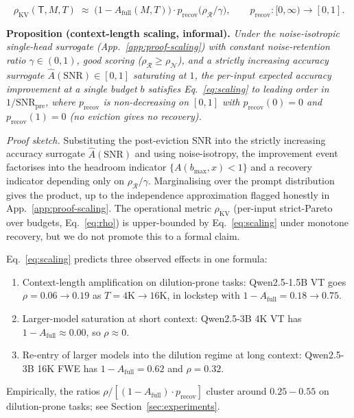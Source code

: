 \documentclass{article} %
\begin{document}
\begin{equation}
\label{eq:scaling}
\rho_{\mathrm{KV}}(\mathsf{T}, M, T) \;\approx\;
\bigl(1 - A_{\mathrm{full}}(M, T)\bigr) \cdot p_{\mathrm{recov}}\bigl(\rho_{\mathcal{R}} / \gamma\bigr),
\qquad p_{\mathrm{recov}}: [0, \infty) \to [0, 1].
\end{equation}

\textbf{Proposition (context-length scaling, informal).} \emph{Under the
noise-isotropic single-head surrogate (App.~\ref{app:proof-scaling}) with
constant noise-retention ratio $\gamma \in (0, 1)$, good scoring
($\rho_{\mathcal{R}} \ge \rho_{\mathcal{N}}$), and a strictly increasing
accuracy surrogate $\hat A(\mathrm{SNR}) \in [0, 1]$ saturating at $1$, the
per-input expected accuracy improvement at a single budget $b$ satisfies
Eq.~\eqref{eq:scaling} to leading order in $1/\mathrm{SNR}_{\mathrm{pre}}$,
where $p_{\mathrm{recov}}$ is non-decreasing on $[0, 1]$ with
$p_{\mathrm{recov}}(0) = 0$ and $p_{\mathrm{recov}}(1) = 0$ (no eviction
gives no recovery).}

\emph{Proof sketch.} Substituting the post-eviction SNR into the strictly
increasing accuracy surrogate $\hat A(\mathrm{SNR})$ and using
noise-isotropy, the improvement event factorises into the headroom
indicator $\{A(b_{\max}, x) < 1\}$ and a recovery indicator depending only
on $\rho_{\mathcal{R}} / \gamma$. Marginalising over the prompt
distribution gives the product, up to the independence approximation
flagged honestly in App.~\ref{app:proof-scaling}. The operational metric
$\rho_{\mathrm{KV}}$ (per-input strict-Pareto over budgets,
Eq.~\eqref{eq:rho}) is upper-bounded by Eq.~\eqref{eq:scaling} under
monotone recovery, but we do not promote this to a formal claim.

Eq.~\eqref{eq:scaling} predicts three observed effects in one formula:
\begin{enumerate}
\item Context-length amplification on dilution-prone tasks: Qwen2.5-1.5B
VT goes $\rho = 0.06 \to 0.19$ as $T = 4\mathrm{K} \to 16\mathrm{K}$, in
lockstep with $1 - A_{\mathrm{full}} = 0.18 \to 0.75$.
\item Larger-model saturation at short context: Qwen2.5-3B 4K VT has
$1 - A_{\mathrm{full}} \approx 0.00$, so $\rho \approx 0$.
\item Re-entry of larger models into the dilution regime at long
context: Qwen2.5-3B 16K FWE has $1 - A_{\mathrm{full}} = 0.62$ and
$\rho = 0.32$.
\end{enumerate}
Empirically, the ratios $\rho / [(1-A_{\mathrm{full}}) \cdot p_{\mathrm{recov}}]$
cluster around $0.25 - 0.55$ on dilution-prone tasks; see
Section~\ref{sec:experiments}.
\end{document}
